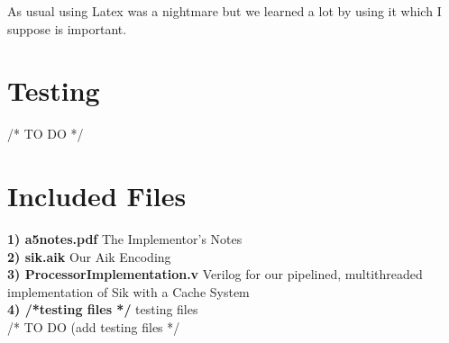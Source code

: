 \documentclass[12pt, twocolumn]{scrartcl}
\begin{document}
As usual using Latex was a nightmare but we learned a lot by using it which I suppose is important.

\section*{Testing}
/* TO DO */

\section*{Included Files}
\textbf {1) a5notes.pdf} The Implementor's Notes \\
\textbf {2) sik.aik} Our Aik Encoding \\
\textbf {3) ProcessorImplementation.v} Verilog for our pipelined, multithreaded implementation of Sik with a Cache System \\
\textbf {4) /*testing files */} testing files \\
/* TO DO (add testing files */
\end{document}
